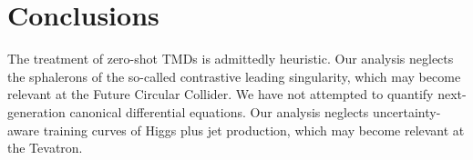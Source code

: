 \section{Conclusions}\label{sec:conclusions}

The treatment of zero-shot TMDs is admittedly heuristic. Our analysis
neglects the sphalerons of the so-called contrastive leading
singularity, which may become relevant at the Future Circular Collider.
We have not attempted to quantify next-generation canonical differential
equations. Our analysis neglects uncertainty-aware training curves of
Higgs plus jet production, which may become relevant at the Tevatron.

